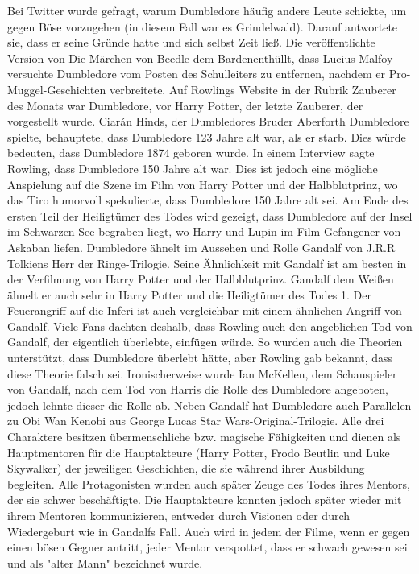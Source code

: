 \documentclass[a4paper, 10pt]{article}
\begin{document}
\vspace{10pt}
\newline
{}  
Bei Twitter wurde gefragt, warum Dumbledore häufig andere Leute schickte, um gegen Böse vorzugehen (in diesem Fall war es Grindelwald). Darauf antwortete sie, dass er seine Gründe hatte und sich selbst Zeit ließ.
\vspace{10pt}
\newline
{}  
Die veröffentlichte Version von Die Märchen von Beedle dem Bardenenthüllt, dass Lucius Malfoy versuchte Dumbledore vom 
Posten des Schulleiters zu entfernen, nachdem er Pro-Muggel-Geschichten verbreitete.
Auf Rowlings Website in der Rubrik Zauberer des Monats war Dumbledore, vor Harry Potter, der letzte Zauberer, der vorgestellt wurde.
\vspace{10pt}
\newline
{}  
Ciarán Hinds, der Dumbledores Bruder Aberforth Dumbledore spielte, behauptete, dass Dumbledore 123 Jahre alt war, als er starb. Dies würde bedeuten, dass Dumbledore 1874 geboren wurde.
In einem Interview sagte Rowling, dass Dumbledore 150 Jahre alt war. Dies ist jedoch eine mögliche Anspielung auf die Szene im Film von Harry Potter und der Halbblutprinz, wo das Tiro humorvoll spekulierte, dass Dumbledore 150 Jahre alt sei.
\vspace{10pt}
\newline
{}  
Am Ende des ersten Teil der Heiligtümer des Todes wird gezeigt, dass Dumbledore auf der Insel im Schwarzen See begraben liegt, wo Harry und Lupin im Film Gefangener von Askaban liefen.
Dumbledore ähnelt im Aussehen und Rolle Gandalf von J.R.R Tolkiens Herr der Ringe-Trilogie. Seine Ähnlichkeit mit Gandalf ist am besten in der Verfilmung von Harry Potter und der Halbblutprinz. Gandalf dem Weißen ähnelt er auch sehr in Harry Potter und die Heiligtümer des Todes 1. Der Feuerangriff auf die Inferi ist auch vergleichbar mit einem ähnlichen Angriff von Gandalf. Viele Fans dachten deshalb, dass Rowling auch den angeblichen Tod von Gandalf, der eigentlich überlebte, einfügen würde. So wurden auch die Theorien unterstützt, dass Dumbledore überlebt hätte, aber Rowling gab bekannt, dass diese Theorie falsch sei. Ironischerweise wurde Ian McKellen, dem Schauspieler von Gandalf, nach dem Tod von Harris die Rolle des Dumbledore angeboten, jedoch lehnte dieser die Rolle ab.
\vspace{10pt}
\newline
{}  
Neben Gandalf hat Dumbledore auch Parallelen zu Obi Wan Kenobi aus George Lucas Star Wars-Original-Trilogie. Alle drei Charaktere besitzen übermenschliche bzw. magische Fähigkeiten und dienen als Hauptmentoren für die Hauptakteure (Harry Potter, Frodo Beutlin und Luke Skywalker) der jeweiligen Geschichten, die sie während ihrer Ausbildung begleiten. Alle Protagonisten wurden auch später Zeuge des Todes ihres Mentors, der sie schwer beschäftigte. Die Hauptakteure konnten jedoch später wieder mit ihrem Mentoren kommunizieren, entweder durch Visionen oder durch Wiedergeburt wie in Gandalfs Fall. Auch wird in jedem der Filme, wenn er gegen einen bösen Gegner antritt, jeder Mentor verspottet, dass er schwach gewesen sei und als "alter Mann" bezeichnet wurde.
\end{document}
